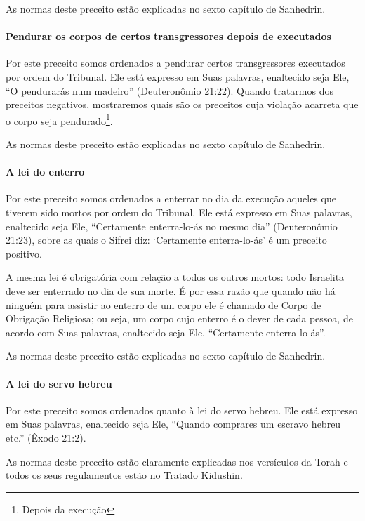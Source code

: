 As normas deste preceito estão explicadas no sexto capítulo de Sanhedrin.


\paragraph{Pendurar os corpos de certos transgressores depois de executados}

Por este preceito somos ordenados a pendurar certos transgressores
executados por ordem do Tribunal. Ele está expresso em Suas palavras,
enaltecido seja Ele, ``O pendurarás num madeiro'' (Deuteronômio 21:22).
Quando tratarmos dos preceitos negativos, mostraremos quais são os
preceitos cuja violação acarreta que o corpo seja
pendurado\footnote{Depois da execução}.

As normas deste preceito estão explicadas no sexto capítulo de Sanhedrin.

\paragraph{A lei do enterro}

Por este preceito somos ordenados a enterrar no dia da execução aqueles
que tiverem sido mortos por ordem do Tribunal. Ele está expresso em Suas
palavras, enaltecido seja Ele, ``Certamente enterra-lo-ás no mesmo dia''
(Deuteronômio 21:23), sobre as quais o Sifrei diz: `Certamente
enterra-lo-ás' é um preceito positivo.

A mesma lei é obrigatória com relação a todos os outros mortos: todo
Israelita deve ser enterrado no dia de sua morte. É por essa razão que
quando não há ninguém para assistir ao enterro de um corpo ele é
chamado de Corpo de Obrigação Religiosa; ou seja, um corpo cujo enterro
é o dever de cada pessoa, de acordo com Suas palavras, enaltecido seja
Ele, ``Certamente enterra-lo-ás''.

As normas deste preceito estão explicadas no sexto capítulo de Sanhedrin.

\paragraph{A lei do servo hebreu}

Por este preceito somos ordenados quanto à lei do servo hebreu. Ele está
expresso em Suas palavras, enaltecido seja Ele, ``Quando comprares um
escravo hebreu etc.'' (Êxodo 21:2).

As normas deste preceito estão claramente explicadas nos versículos da
Torah e todos os seus regulamentos estão no Tratado Kidushin.

